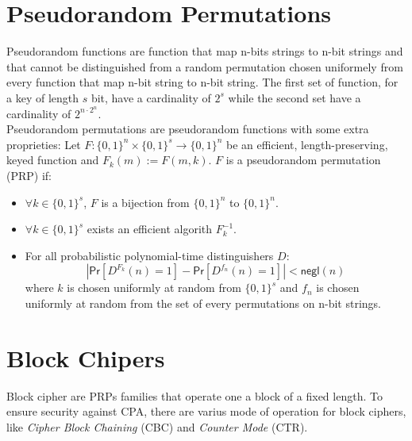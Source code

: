 \section{Pseudorandom Permutations}
Pseudorandom functions are function that map n-bits strings to n-bit strings and that cannot be distinguished from a random permutation chosen uniformely from every function that map n-bit string to n-bit string.
The first set of function, for a key of length $s$ bit, have a cardinality of $2^{s}$ while the second set have a cardinality of $2^{n\cdot2^n}$.\\
Pseudorandom permutations are pseudorandom functions with some extra proprieties:
Let $F : \{0,1\}^{n} \times \{0,1\}^{s} \rightarrow \{0,1\}^{n}$ be an efficient, length-preserving, keyed function and $F_k(m) := F(m, k)$.
$F$ is a pseudorandom permutation (PRP) if:
\begin{itemize}
    \item{$\forall k \in \{0,1\}^{s}$, $F$ is a bijection from $\{0,1\}^{n}$ to $\{0,1\}^{n}$}.
    \item{$\forall k \in \{0,1\}^{s}$ exists an efficient algorith $F^{-1}_k$.}
    \item{For all probabilistic polynomial-time distinguishers $D$:
        $$
            |\mathsf{Pr}[D^{F_k}(n) = 1] - \mathsf{Pr}[D^{f_n}(n) = 1]| < \mathsf{negl}(n)
        $$
        where $k$ is chosen uniformly at random from $\{0,1\}^{s}$ and $f_n$ is chosen uniformly at random from the set of every permutations on n-bit strings.
        }
\end{itemize}

\section{Block Chipers}
Block cipher are PRPs families that operate one a block of a fixed length. To ensure security against CPA, there are varius mode of operation for block ciphers, like \emph{Cipher Block Chaining} (CBC) and \emph{Counter Mode} (CTR).
